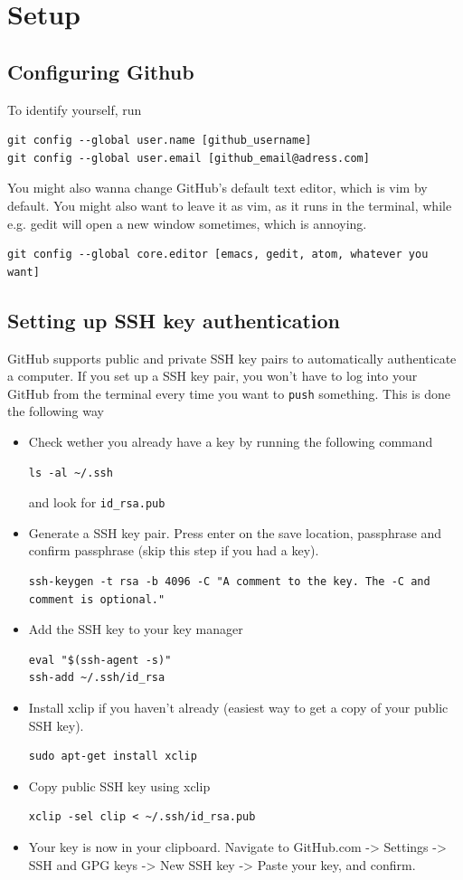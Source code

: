 \documentclass[12p,a4paper]{article}
\begin{document}
\section{Setup}
\subsection{Configuring Github}
To identify yourself, run
\begin{verbatim}
git config --global user.name [github_username]
git config --global user.email [github_email@adress.com]
\end{verbatim}
You might also wanna change GitHub's default text editor, which is vim by default. You might also want to leave it as vim, as it runs in the terminal, while e.g. gedit will open a new window sometimes, which is annoying.
\begin{verbatim}
git config --global core.editor [emacs, gedit, atom, whatever you want]
\end{verbatim}


\subsection{Setting up SSH key authentication}
GitHub supports public and private SSH key pairs to automatically authenticate a computer. If you set up a SSH key pair, you won't have to log into your GitHub from the terminal every time you want to \texttt{push} something. This is done the following way
\begin{itemize}
\item Check wether you already have a key by running the following command
\begin{verbatim}
ls -al ~/.ssh
\end{verbatim}
and look for \texttt{id\_rsa.pub}
\item Generate a SSH key pair. Press enter on the save location, passphrase and confirm passphrase (skip this step if you had a key).
\begin{verbatim}
ssh-keygen -t rsa -b 4096 -C "A comment to the key. The -C and comment is optional."
\end{verbatim}
\item Add the SSH key to your key manager
\begin{verbatim}
eval "$(ssh-agent -s)"
ssh-add ~/.ssh/id_rsa
\end{verbatim}
\item Install xclip if you haven't already (easiest way to get a copy of your public SSH key).
\begin{verbatim}
sudo apt-get install xclip
\end{verbatim}
\item Copy public SSH key using xclip
\begin{verbatim}
xclip -sel clip < ~/.ssh/id_rsa.pub
\end{verbatim}
\item Your key is now in your clipboard. Navigate to GitHub.com -> Settings -> SSH and GPG keys -> New SSH key -> Paste your key, and confirm.
\end{itemize}
\end{document}
